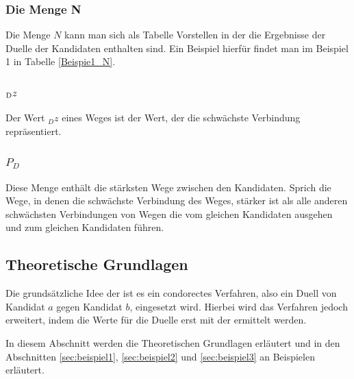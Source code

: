 \subsubsection{Die Menge N}
\label{mengeN}
Die Menge $N$ kann man sich als Tabelle Vorstellen in der die Ergebnisse der Duelle der Kandidaten enthalten sind. Ein Beispiel hierfür findet man im Beispiel 1 in Tabelle \ref{Beispie1_N}.


\subsubsection{$\textsubscript{D}z$}
\label{dz}
Der Wert $_{D}z$ eines Weges ist der Wert, der die schwächste Verbindung repräsentiert.

\subsubsection{$P_{D}$}
\label{PD}
Diese Menge enthält die stärksten Wege zwischen den Kandidaten. Sprich die Wege, in denen die schwächste Verbindung des Weges, stärker ist als alle anderen schwächsten Verbindungen von Wegen die vom gleichen Kandidaten ausgehen und zum gleichen Kandidaten führen.

\subsection{Theoretische Grundlagen} 
\label{sec:theoretische Grundlagen}

Die grundsätzliche Idee der \schulze ist es ein condorectes Verfahren, also ein Duell von Kandidat $a$ gegen Kandidat $b$, eingesetzt wird. Hierbei wird das Verfahren jedoch erweitert, indem die Werte für die Duelle erst mit der \schulze ermittelt werden.

In diesem Abschnitt werden die Theoretischen Grundlagen erläutert und in den Abschnitten \ref{sec:beispiel1},  \ref{sec:beispiel2} und \ref{sec:beispiel3} an Beispielen erläutert.


\def\namedlabel#1#2{\begingroup
    #2%
    \def\@currentlabel{#2}%
    \phantomsection\label{#1}\endgroup
}

